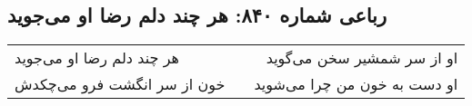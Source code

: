 \begin{center}
\section*{رباعی شماره ۸۴۰: هر چند دلم رضا او می‌جوید}
\label{sec:0840}
\begin{longtable}{l p{0.5cm} r}
هر چند دلم رضا او می‌جوید
&&
او از سر شمشیر سخن می‌گوید
\\
خون از سر انگشت فرو می‌چکدش
&&
او دست به خون من چرا می‌شوید
\\
\end{longtable}
\end{center}
